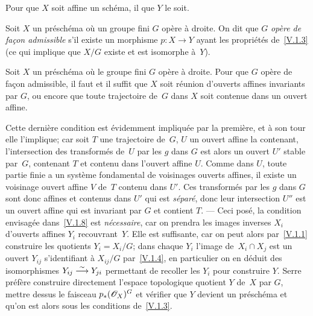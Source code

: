 \begin{corollaire}
\label{V.1.6}
Pour que $X$ soit affine \resp un sch\'ema, il \fets que $Y$ le
soit.
\end{corollaire}

\begin{definition}
\label{V.1.7}
Soit
$X$ un pr\'esch\'ema o\`u un groupe fini $G$ op\`ere
\`a droite. On dit que $G$ \emph{opère de fa\c con admissible}
s'il existe un morphisme $p\colon X\to Y$ ayant les propri\'et\'es
de~\ref{V.1.3} (ce qui implique que $X/G$ existe et est isomorphe
\`a~$Y$).
\end{definition}

\begin{proposition}
\label{V.1.8}
Soit $X$ un pr\'esch\'ema o\`u le groupe fini $G$ op\`ere
\`a droite. Pour que $G$ op\`ere de fa\c con admissible, il faut
et il suffit que $X$ soit r\'eunion d'ouverts affines invariants par
$G$, ou encore que toute trajectoire de~$G$ dans $X$ soit contenue
dans un ouvert affine.
\end{proposition}

Cette derni\`ere condition est \'evidemment impliqu\'ee par la
premi\`ere, et \`a son tour elle l'implique; car soit $T$ une
trajectoire de~$G$, $U$ un ouvert affine la contenant, l'intersection
des transform\'es de~$U$ par les
$g$ dans $G$
est alors un ouvert $U'$ stable par~$G$, contenant $T$ et contenu dans
l'ouvert affine $U$. Comme dans $U$, toute partie finie a un
syst\`eme fondamental de voisinages ouverts affines, il existe un
voisinage ouvert affine $V$ de~$T$ contenu dans $U'$. Ces
transform\'es par les
$g$ dans $G$
sont donc affines et contenus dans $U'$ qui est \emph{séparé},
donc leur intersection $U''$ est un ouvert affine qui est invariant
par $G$ et contient $T$.
--- Ceci pos\'e, la condition envisag\'ee dans~\ref{V.1.8} est
\emph{nécessaire}, car on prendra les images inverses $X_i$
d'ouverts affines $Y_i$ recouvrant~$Y$. Elle est suffisante, car on
peut alors par~\ref{V.1.1} construire les quotients $Y_i=X_i/G$; dans
chaque $Y_i$ l'image de~$X_i\cap X_j$ est un ouvert $Y_{ij}$
s'identifiant \`a $X_{ij}/G$ par~\ref{V.1.4}, en particulier on en
d\'eduit des isomorphismes $Y_{ij}\overset{\sim}{\longrightarrow} Y_{ji}$ permettant de
recoller les $Y_i$ pour construire $Y$. Serre pr\'ef\`ere
construire directement l'espace topologique quotient $Y$ de~$X$ par
$G$, mettre dessus le faisceau $p_*(\cal{O}_X)^G$ et v\'erifier que
$Y$ devient un pr\'esch\'ema et qu'on est alors sous les
conditions de~\ref{V.1.3}.


\setcounter{subsection}{6}


